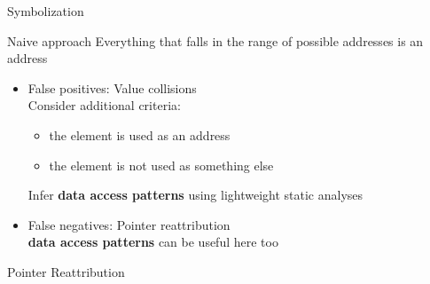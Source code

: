 \documentclass[]{beamer}
\begin{document}
\begin{frame}{Symbolization}
  \begin{block}{Naive approach}
    Everything that falls in the range of
    possible addresses is an address
    \end{block}
  \begin{itemize}
  \item {\color{gray}
    False positives:
    Value collisions\\
    Consider additional criteria:
    \begin{itemize}
     \item \color{gray}the element is used as an address
     \item \color{gray}the element is not used as something else
    \end{itemize}
    Infer \textbf{data access patterns} using lightweight static analyses\\
   }
  \item False negatives: Pointer reattribution\\
    \textbf{data access patterns} can be useful here too
  \end{itemize}
\end{frame}
\begin{frame}{Pointer Reattribution}
\end{frame}
\end{document}
